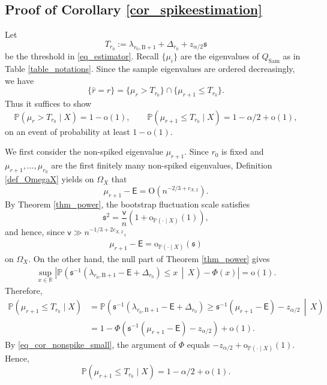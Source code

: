 \documentclass[12pt]{article}
\theoremstyle{plain}
\numberwithin{equation}{section}
\begin{document}
\subsection{Proof of Corollary \ref{cor_spikeestimation}}

Let
\[
T_{r_0}
:=
\lambda_{r_0,\mathrm{B}+1}+\Delta_{r_0}+z_{\alpha/2}\mathfrak{s}
\]
be the threshold in \eqref{eq_estimator}. Recall $\{\mu_i\}$ are the eigenvalues of $Q_{\mathrm{Sam}}$ as in Table \ref{table_notations}. Since the sample eigenvalues are ordered decreasingly, we have
\[
\{\widehat r=r\}
=
\{\mu_r>T_{r_0}\}\cap\{\mu_{r+1}\le T_{r_0}\}.
\]
Thus it suffices to show
\[
\mathbb P(\mu_r>T_{r_0}\mid X)=1-\mathrm o(1),
\qquad
\mathbb P(\mu_{r+1}\le T_{r_0}\mid X)=1-\alpha/2+\mathrm o(1),
\]
on an event of probability at least $1-\mathrm o(1)$.

We first consider the non-spiked eigenvalue $\mu_{r+1}$. Since $r_0$ is fixed and $\mu_{r+1},\dots,\mu_{r_0}$ are the first finitely many non-spiked eigenvalues, Definition \ref{def_OmegaX} yields on $\Omega_X$ that
\[
\mu_{r+1}-\mathsf E=\mathrm O(n^{-2/3+c_{X,2}}).
\]
By Theorem \ref{thm_power}, the bootstrap fluctuation scale satisfies
\[
\mathfrak s^2=\frac{\mathsf v}{n}(1+\mathrm o_{\mathbb P(\cdot\mid X)}(1)),
\]
and hence, since $\mathsf v\gg n^{-1/3+2c_{X,2}}$,
\begin{align}\label{eq_cor_nonspike_small}
	\mu_{r+1}-\mathsf E=
	\mathrm o_{\mathbb P(\cdot\mid X)}(\mathfrak s)
\end{align}
on $\Omega_X$.
On the other hand, the null part of Theorem \ref{thm_power} gives
\begin{align}\label{eq_cor_studentized}
	\sup_{x\in\mathbb R}
	\left|
	\mathbb P\left(
	\mathfrak s^{-1}
	(\lambda_{r_0,\mathrm{B}+1}-\mathsf E+\Delta_{r_0})
	\le x
	\,\middle|\,X
	\right)-\Phi(x)\right|
	=
	\mathrm o(1).
\end{align}
Therefore,
\begin{align*}
	\mathbb P(\mu_{r+1}\le T_{r_0}\mid X)
	&=
	\mathbb P\left(
	\mathfrak s^{-1}
	(\lambda_{r_0,\mathrm{B}+1}-\mathsf E+\Delta_{r_0})
	\ge
	\mathfrak s^{-1}(\mu_{r+1}-\mathsf E)-z_{\alpha/2}
	\,\middle|\,X
	\right)\\
	&=
	1-\Phi\!\left(
	\mathfrak s^{-1}(\mu_{r+1}-\mathsf E)-z_{\alpha/2}
	\right)
	+
	\mathrm o(1).
\end{align*}
By \eqref{eq_cor_nonspike_small}, the argument of $\Phi$ equals $-z_{\alpha/2}+\mathrm o_{\mathbb P(\cdot\mid X)}(1)$. Hence,
\[
\mathbb P(\mu_{r+1}\le T_{r_0}\mid X)
=
1-\alpha/2+\mathrm o(1).
\]
\end{document}
